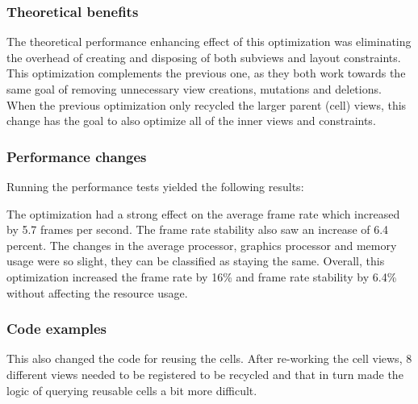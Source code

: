 \documentclass[a4paper,12pt]{article}
\begin{document}
\subsubsection*{Theoretical benefits}
The theoretical performance enhancing effect of this optimization was eliminating the overhead of creating and disposing of both subviews and layout constraints. This optimization complements the previous one, as they both work towards the same goal of removing unnecessary view creations, mutations and deletions. When the previous optimization only recycled the larger parent (cell) views, this change has the goal to also optimize all of the inner views and constraints.

\subsubsection*{Performance changes}
Running the performance tests yielded the following results:

The optimization had a strong effect on the average frame rate which increased by 5.7 frames per second. The frame rate stability also saw an increase of 6.4 percent. The changes in the average processor, graphics processor and memory usage were so slight, they can be classified as staying the same. Overall, this optimization increased the frame rate by 16\% and frame rate stability by 6.4\% without affecting the resource usage.

\subsubsection*{Code examples}
This also changed the code for reusing the cells. After re-working the cell views, 8 different views needed to be registered to be recycled and that in turn made the logic of querying reusable cells a bit more difficult.
\end{document}
